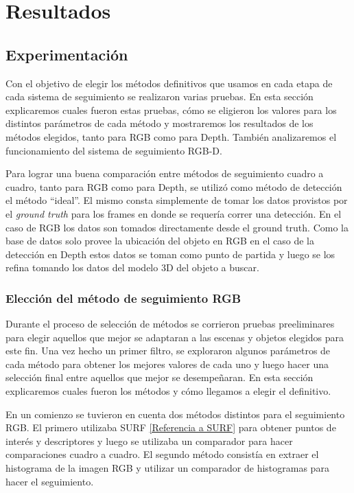 \chapter{Resultados}
\section{Experimentación}
Con el objetivo de elegir los métodos definitivos que usamos en cada etapa de cada sistema de seguimiento se realizaron varias pruebas. En esta sección explicaremos cuales fueron estas pruebas, cómo se eligieron los valores para los distintos parámetros de cada método y mostraremos los resultados de los métodos elegidos, tanto para RGB como para Depth. También analizaremos el funcionamiento del sistema de seguimiento RGB-D.

Para lograr una buena comparación entre métodos de seguimiento cuadro a cuadro, tanto para RGB como para Depth, se utilizó como método de detección el método ``ideal''. El mismo consta simplemente de tomar los datos provistos por el \textit{ground truth} para los frames en donde se requería correr una detección. En el caso de RGB los datos son tomados directamente desde el ground truth. Como la base de datos solo provee la ubicación del objeto en RGB en el caso de la detección en Depth estos datos se toman como punto de partida y luego se los refina tomando los datos del modelo 3D del objeto a buscar.

\subsection{Elección del método de seguimiento RGB}
Durante el proceso de selección de métodos se corrieron pruebas preeliminares para elegir aquellos que mejor se adaptaran a las escenas y objetos elegidos para este fin. Una vez hecho un primer filtro, se exploraron algunos parámetros de cada método para obtener los mejores valores de cada uno y luego hacer una selección final entre aquellos que mejor se desempeñaran. En esta sección explicaremos cuales fueron los métodos y cómo llegamos a elegir el definitivo.

En un comienzo se tuvieron en cuenta dos métodos distintos para el seguimiento RGB. El primero utilizaba SURF \ref{Referencia a SURF} para obtener puntos de interés y descriptores y luego se utilizaba un comparador para hacer comparaciones cuadro a cuadro. El segundo método consistía en extraer el histograma de la imagen RGB y utilizar un comparador de histogramas para hacer el seguimiento. 

